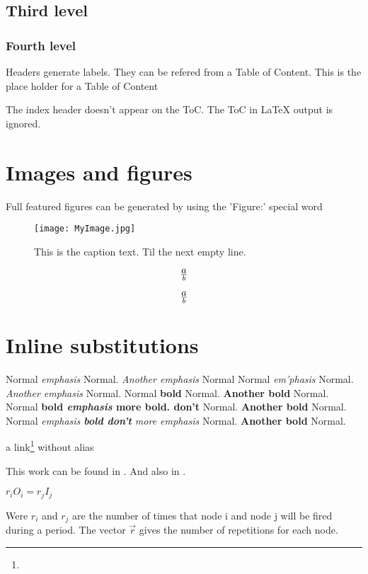 \subsection{Third level}

\subsubsection{Fourth level}

Headers generate labels.
They can be refered from a Table of Content.
This is the place holder for a Table of Content



The index header doesn't appear on the ToC.
The ToC in LaTeX output is ignored.

\section{Images and figures}
\label{OtherLabel}

Full featured figures can be generated by using the 'Figure:' special word
\begin{figure*}[htbp]
\begin{center}\texttt{[image: MyImage.jpg]}\end{center}
\caption{%
This is the caption text.
Til the next empty line.
}
\label{MyLabel}
\end{figure*}


\[
a\over{b}
\]

\begin{equation}
a\over{b}
\end{equation}


\section{Inline substitutions}

Normal {\em emphasis} Normal. {\em Another emphasis} Normal
Normal {\em em'phasis} Normal. {\em Another emphasis} Normal.
Normal {\bf bold} Normal. {\bf Another bold} Normal.
Normal {\bf bold {\em emphasis} more bold. don't } Normal. {\bf Another bold} Normal.
Normal {\em emphasis {\bf bold don't} more emphasis} Normal. {\bf Another bold} Normal.

a link\footnote{}
 without alias

This work can be found in \cite{lee87}. And also in \cite{www-CLAM}.


$r_iO_i=r_jI_j$

Were $r_i$ and $r_j$ are the number of times that node i and node j will be fired during a period. The vector $\vec{r}$ gives the number of repetitions for each node.


